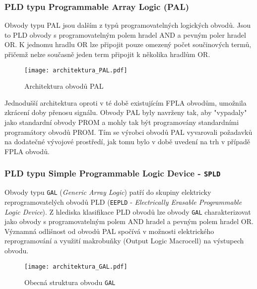 {     \subsubsection{PLD typu Programmable Array Logic (PAL)}\label{PLO_kap_PAL}
        Obvody typu PAL jsou dalším z typů programovatelných logických obvodů. Jsou to PLD obvody s
        programovatelným polem hradel AND a pevným poler hradel OR. K jednomu hradlu OR lze
        připojit pouze omezený počet součinových termů, přičemž nelze současně jeden term připojit
        k několika hradlům OR.
      
        \begin{figure}[ht!]
          \centering
          \texttt{[image: architektura\_PAL.pdf]}
          \caption[Architektura obvodů PAL]{Architektura obvodů PAL}
          \label{PLO:fig_arch_PAL}
        \end{figure}
        
        Jednodušší architektura oproti v té době existujícím FPLA obvodům, umožnila zkrácení doby
        přenosu signálu. Obvody PAL byly navrženy tak, aby "vypadaly" jako standardní obvody PROM a
        mohly tak být programovány standardními programátory obvodů PROM. Tím se výrobci obvodů PAL
        vyvarovali požadavků na dodatečné vývojové prostředí, jak tomu bylo v době uvedení na trh v
        případě FPLA obvodů.
        
     \subsubsection{PLD typu Simple Programmable Logic Device - \texttt{SPLD}}\label{PLO_kap_GAL}
       Obvody typu \texttt{GAL} (\emph{Generic Array Logic}) patří do skupiny elektricky
       reprogramovatelých obvodů PLD (\texttt{EEPLD} - \emph{Electrically Erasable Programmable
       Logic Device}). Z hlediska klasifikace PLD obvodů lze obvody \texttt{GAL} charakterizovat
       jako obvody s programovatelným polem AND hradel a pevným polem hradel OR. Významná
       od\-liš\-nost od obvodů PAL spočívá v možnosti elektrického reprogramování a využití
       makro\-buň\-ky (Output Logic Macrocell) na výstupech obvodu.
       
        \begin{figure}[hb!]
          \centering
          \texttt{[image: architektura\_GAL.pdf]}
          \caption[Struktura obvodu GAL]{Obecná struktura obvodu \texttt{GAL}}
          \label{PLO:fig_arch_GAL}
        \end{figure}
               
}
